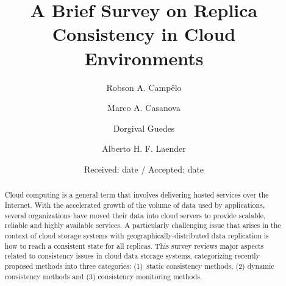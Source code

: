 \title{A Brief Survey on Replica Consistency in Cloud Environments
}


\author{Robson A. Campêlo \and Marco A. Casanova \and Dorgival Guedes \and Alberto H. F. Laender
}



\date{Received: date / Accepted: date}


\maketitle

\begin{abstract}
Cloud computing is a general term that involves delivering hosted services over the Internet. With the accelerated growth of the volume of data used by applications, several organizations have moved their data into cloud servers to provide scalable, reliable and highly available services. A particularly challenging issue that arises in the context of cloud storage systems with geo\-graphi\-cally-distributed data replication is how to reach a consistent state for all replicas. This survey reviews major aspects related to consistency issues in cloud data storage systems, categorizing recently proposed methods into three catego\-ries: (1)~static consistency methods, (2) dynamic consistency methods and (3) consistency monitoring methods.
\end{abstract}

